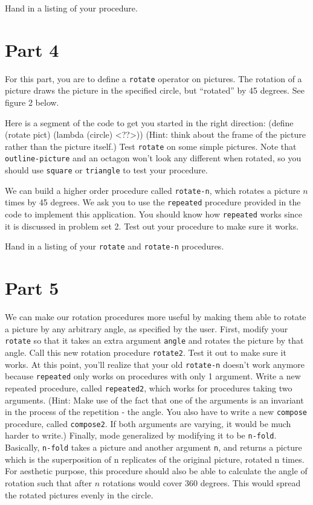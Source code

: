 Hand in a listing of your procedure.

\section{Part 4}

For this part, you are to define a {\tt rotate} operator on pictures. 
The rotation of a picture draws the picture in the specified circle, but
``rotated'' by 45 degrees.  See figure 2 below.

\beginfigure 
\vskip 3in
\endfigure

Here is a segment of the code to get you started in the right direction:
\beginlisp
(define (rotate pict)
  (lambda (circle)
    <??>))
\endlisp
(Hint:  think about the frame of the picture rather than the picture
itself.)
Test {\tt rotate} on some simple pictures.  Note that
{\tt outline-picture} and an octagon won't look any different when
rotated, so you should use {\tt square} or {\tt triangle} to test your
procedure.

We can build a higher order procedure called {\tt rotate-n}, which
rotates a picture $n$ times by 45 degrees.  We ask you to use the
{\tt repeated} procedure provided in the code to implement this
application.  You should know how {\tt repeated} works since it
is discussed in problem set 2.
Test out your procedure to make sure it works.

Hand in a listing of your {\tt rotate} and {\tt rotate-n} procedures.

\section{Part 5}

We can make our rotation procedures more useful by making them able
to rotate a picture by any arbitrary angle, as specified by the user.
First, modify your {\tt rotate} so that it takes an extra argument
{\tt angle} and rotates the picture by that angle.  Call this new
rotation procedure {\tt rotate2}.  Test it out to make
sure it works.  At this point, you'll realize that your old {\tt rotate-n}
doesn't work anymore because {\tt repeated} only works on procedures with
only 1 argument.   Write a new repeated
procedure, called {\tt repeated2}, which works for procedures taking
two arguments.  (Hint:  Make use of the fact that
one of the arguments is an invariant in the process of the repetition -
the angle.  You also have to write a new {\tt compose} procedure, called
{\tt compose2}.  If both arguments are varying, it would be much harder
to write.)  Finally, mode generalized by
modifying it to be {\tt n-fold}.  Basically, {\tt n-fold} takes
a picture and another argument {\tt n}, and returns a picture
which is the superposition of n replicates of the original
picture, rotated n times.  For aesthetic purpose, this
procedure should also be able to calculate the angle of
rotation such that after $n$ rotations would cover 360 degrees.
This would spread the rotated pictures evenly in the circle.


